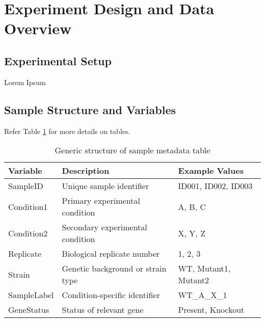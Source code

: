 \section{Experiment Design and Data Overview}

\subsection{Experimental Setup}

Lorem Ipsum

\subsection{Sample Structure and Variables}

Refer Table \ref{tab:generic_table} for more details on tables. 

\begin{table}[h!]
\centering
\begin{tabular}{|l|l|l|}
\hline
\textbf{Variable} & \textbf{Description} & \textbf{Example Values} \\
\hline
SampleID & Unique sample identifier & ID001, ID002, ID003 \\
Condition1 & Primary experimental condition & A, B, C \\
Condition2 & Secondary experimental condition & X, Y, Z \\
Replicate & Biological replicate number & 1, 2, 3 \\
Strain & Genetic background or strain type & WT, Mutant1, Mutant2 \\
SampleLabel & Condition-specific identifier & WT\_A\_X\_1 \\
GeneStatus & Status of relevant gene & Present, Knockout \\
\hline
\end{tabular}
\caption{Generic structure of sample metadata table}
\label{tab:generic_table}
\end{table}

\newpage